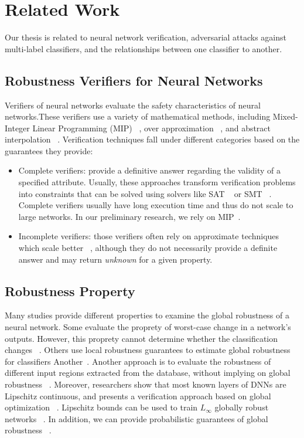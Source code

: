 
\section{Related Work}
Our thesis is related to neural network verification, adversarial attacks against multi-label classifiers, and the relationships between one classifier to another.

\subsection{Robustness Verifiers for Neural Networks}\label{subsec:verifiers}
Verifiers of neural networks evaluate the safety characteristics of neural networks.These verifiers use a variety of mathematical methods, including Mixed-Integer Linear Programming (MIP) ~\cite{singh2018robustness,lazarus2022mixed}, over approximation ~\cite{qin2019verification}, and abstract interpolation ~\cite{ABSTRACTINTER,INCOMPLETE1}. Verification techniques fall under different categories based on the guarantees they provide:
\begin{itemize}
    \item  Complete verifiers: provide a definitive answer regarding the validity of a specified attribute. Usually, these approaches transform verification problems into constraints that can be solved using solvers like SAT ~\cite{SATAPPROACH1,SATAPPROACH2} or SMT ~\cite{NNTOBINARCONSTRAINS,PLANET,Reluplex}. Complete verifiers usually have long execution time and thus do not scale to large networks.
        In our preliminary research, we rely on MIP~\cite{MIPVERIFY}.
    \item Incomplete verifiers: those verifiers often rely on approximate techniques which scale better ~\cite{INCOMPLETE1,INCOMPLETE2}, although they do not necessarily provide a definite answer and may return \emph{unknown} for a given property. 
\end{itemize}

\subsection{Robustness Property}
Many studies provide different properties to examine the global robustness of a neural network.
Some evaluate the proprety of worst-case change in a network’s outputs. However, this proprety cannot determine whether the classification changes ~\cite{Reluplex,EFCIENTGLOBALROBU}. Others use local robustness guarantees to estimate global robustness for classifiers Another~\cite{MEASURENNROBCON,GLOBALPROPERTY}. Another approach is to evaluate the robustness of different input regions extracted from the database, without implying on global robustness  ~\cite{ROBUSTFROMDATASET}. Moreover, researchers show that most known layers of DNNs are Lipschitz continuous, and presents a verification approach based on global optimization ~\cite{ANOTHERGLOBALPROPERTY}. Lipschitz bounds can be used to  train \( L_\infty \) globally robust networks ~\cite{RETHINKLIP}. In addition, we can provide probabilistic guarantees of global robustness ~\cite{GROMA}.

